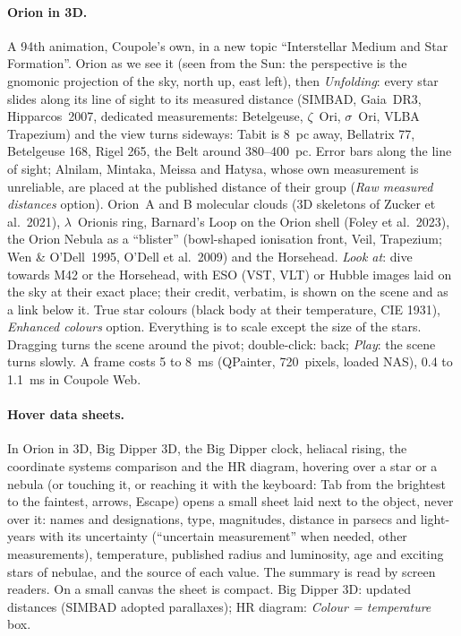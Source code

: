 \paragraph{Orion in 3D.} A 94th animation, Coupole's own, in a new topic “Interstellar Medium and Star Formation”.
Orion as we see it (seen from the Sun: the perspective is the gnomonic projection of the sky, north up, east left),
then \emph{Unfolding}: every star slides along its line of sight to its measured distance (SIMBAD, Gaia~DR3,
Hipparcos~2007, dedicated measurements: Betelgeuse, $\zeta$~Ori, $\sigma$~Ori, VLBA Trapezium) and the view turns
sideways: Tabit is 8~pc away, Bellatrix 77, Betelgeuse 168, Rigel 265, the Belt around 380–400~pc. Error bars along
the line of sight; Alnilam, Mintaka, Meissa and Hatysa, whose own measurement is unreliable, are placed at the
published distance of their group (\emph{Raw measured distances} option). Orion~A and B molecular clouds (3D skeletons
of Zucker et al.~2021), $\lambda$~Orionis ring, Barnard's Loop on the Orion shell (Foley et al.~2023), the Orion
Nebula as a “blister” (bowl-shaped ionisation front, Veil, Trapezium; Wen \& O'Dell~1995, O'Dell et al.~2009) and the
Horsehead. \emph{Look at}: dive towards M42 or the Horsehead, with ESO (VST, VLT) or Hubble images laid on the sky at
their exact place; their credit, verbatim, is shown on the scene and as a link below it. True star colours (black body
at their temperature, CIE 1931), \emph{Enhanced colours} option. Everything is to scale except the size of the stars.
Dragging turns the scene around the pivot; double-click: back; \emph{Play}: the scene turns slowly. A frame costs 5
to 8~ms (QPainter, 720~pixels, loaded NAS), 0.4 to 1.1~ms in Coupole Web.

\paragraph{Hover data sheets.} In Orion in 3D, Big Dipper 3D, the Big Dipper clock, heliacal rising, the coordinate
systems comparison and the HR diagram, hovering over a star or a nebula (or touching it, or reaching it with the
keyboard: Tab from the brightest to the faintest, arrows, Escape) opens a small sheet laid next to the object, never
over it: names and designations, type, magnitudes, distance in parsecs and light-years with its uncertainty
(“uncertain measurement” when needed, other measurements), temperature, published radius and luminosity, age and
exciting stars of nebulae, and the source of each value. The summary is read by screen readers. On a small canvas the
sheet is compact. Big Dipper 3D: updated distances (SIMBAD adopted parallaxes); HR diagram: \emph{Colour = temperature}
box.

